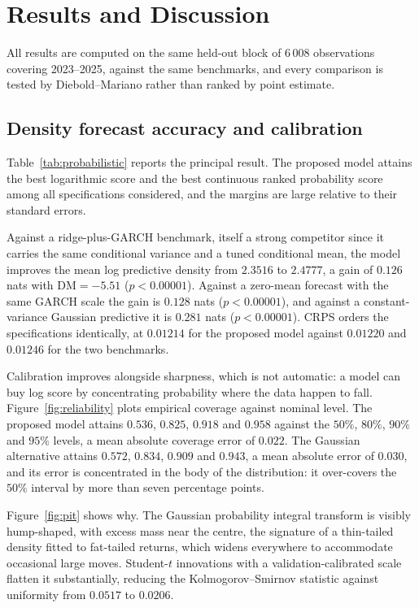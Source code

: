
\section{Results and Discussion}
\label{sec:results}

All results are computed on the same held-out block of 6\,008 observations
covering 2023--2025, against the same benchmarks, and every comparison is tested
by Diebold--Mariano rather than ranked by point estimate.

\subsection{Density forecast accuracy and calibration}
\label{sec:density}

Table~\ref{tab:probabilistic} reports the principal result. The proposed model
attains the best logarithmic score and the best continuous ranked probability
score among all specifications considered, and the margins are large relative to
their standard errors.

Against a ridge-plus-GARCH benchmark, itself a strong competitor since it
carries the same conditional variance and a tuned conditional mean, the model
improves the mean log predictive density from $2.3516$ to $2.4777$, a gain of
$0.126$ nats with $\mathrm{DM}=-5.51$ ($p<0.00001$). Against a zero-mean
forecast with the same GARCH scale the gain is $0.128$ nats ($p<0.00001$), and
against a constant-variance Gaussian predictive it is $0.281$ nats
($p<0.00001$). CRPS orders the specifications identically, at $0.01214$ for the
proposed model against $0.01220$ and $0.01246$ for the two benchmarks.

Calibration improves alongside sharpness, which is not automatic: a model can
buy log score by concentrating probability where the data happen to fall.
Figure~\ref{fig:reliability} plots empirical coverage against nominal level. The
proposed model attains $0.536$, $0.825$, $0.918$ and $0.958$ against the
$50\%$, $80\%$, $90\%$ and $95\%$ levels, a mean absolute coverage error of
$0.022$. The Gaussian alternative attains $0.572$, $0.834$, $0.909$ and $0.943$,
a mean absolute error of $0.030$, and its error is concentrated in the body of
the distribution: it over-covers the $50\%$ interval by more than seven
percentage points.

Figure~\ref{fig:pit} shows why. The Gaussian probability integral transform is
visibly hump-shaped, with excess mass near the centre, the signature of a
thin-tailed density fitted to fat-tailed returns, which widens everywhere to
accommodate occasional large moves. Student-$t$ innovations with a
validation-calibrated scale flatten it substantially, reducing the
Kolmogorov--Smirnov statistic against uniformity from $0.0517$ to $0.0206$.

